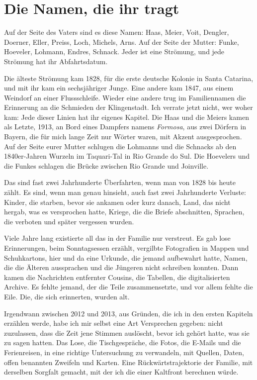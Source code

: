 \documentclass[
  ngerman,
  11pt,
  openany]{book}
\begin{document}
\section{Die Namen, die ihr tragt}\label{die-namen-die-ihr-tragt}

Auf der Seite des Vaters sind es diese Namen: Haas, Meier, Voit,
Dengler, Doerner, Eller, Preiss, Loch, Michels, Arns. Auf der Seite der
Mutter: Funke, Hoeveler, Lohmann, Endres, Schnack. Jeder ist eine
Strömung, und jede Strömung hat ihr Abfahrtsdatum.

Die älteste Strömung kam 1828, für die erste deutsche Kolonie in Santa
Catarina, und mit ihr kam ein sechsjähriger Junge. Eine andere kam 1847,
aus einem Weindorf an einer Flussschleife. Wieder eine andere trug im
Familiennamen die Erinnerung an die Schmieden der Klingenstadt. Ich
verrate jetzt nicht, wer woher kam: Jede dieser Linien hat ihr eigenes
Kapitel. Die Haas und die Meiers kamen als Letzte, 1913, an Bord eines
Dampfers namens \emph{Formosa}, aus zwei Dörfern in Bayern, die für mich
lange Zeit nur Wörter waren, mit Akzent ausgesprochen. Auf der Seite
eurer Mutter schlugen die Lohmanns und die Schnacks ab den 1840er-Jahren
Wurzeln im Taquari-Tal in Rio Grande do Sul. Die Hoevelers und die
Funkes schlagen die Brücke zwischen Rio Grande und Joinville.

Das sind fast zwei Jahrhunderte Überfahrten, wenn man von 1828 bis heute
zählt. Es sind, wenn man genau hinsieht, auch fast zwei Jahrhunderte
Verluste: Kinder, die starben, bevor sie ankamen oder kurz danach, Land,
das nicht hergab, was es versprochen hatte, Kriege, die die Briefe
abschnitten, Sprachen, die verboten und später vergessen wurden.

Viele Jahre lang existierte all das in der Familie nur verstreut. Es gab
lose Erinnerungen, beim Sonntagsessen erzählt, vergilbte Fotografien in
Mappen und Schuhkartons, hier und da eine Urkunde, die jemand aufbewahrt
hatte, Namen, die die Älteren aussprachen und die Jüngeren nicht
schreiben konnten. Dann kamen die Nachrichten entfernter Cousins, die
Tabellen, die digitalisierten Archive. Es fehlte jemand, der die Teile
zusammensetzte, und vor allem fehlte die Eile. Die, die sich erinnerten,
wurden alt.

Irgendwann zwischen 2012 und 2013, aus Gründen, die ich in den ersten
Kapiteln erzählen werde, habe ich mir selbst eine Art Versprechen
gegeben: nicht zuzulassen, dass die Zeit jene Stimmen auslöscht, bevor
ich gehört hatte, was sie zu sagen hatten. Das Lose, die Tischgespräche,
die Fotos, die E-Mails und die Ferienreisen, in eine richtige
Untersuchung zu verwandeln, mit Quellen, Daten, offen benannten Zweifeln
und Karten. Eine Rückwärtstrajektorie der Familie, mit derselben
Sorgfalt gemacht, mit der ich die einer Kaltfront berechnen würde.
\end{document}
